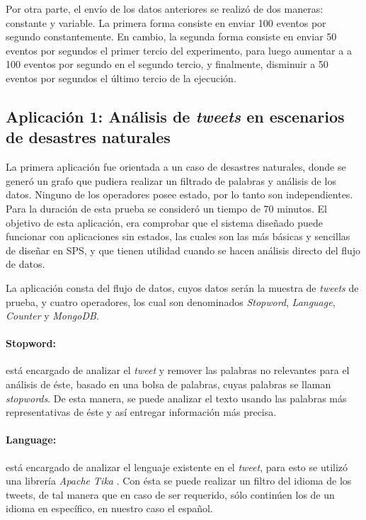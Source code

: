 Por otra parte, el envío de los datos anteriores se realizó de dos maneras: constante y variable. La primera forma consiste en enviar 100 eventos por segundo constantemente. En cambio, la segunda forma consiste en enviar 50 eventos por segundos el primer tercio del experimento, para luego aumentar a a 100 eventos por segundo en el segundo tercio, y finalmente, disminuir a 50 eventos por segundos el último tercio de la ejecución.

\subsection{Aplicación 1: Análisis de \textit{tweets} en escenarios de desastres naturales}
La primera aplicación fue orientada a un caso de desastres naturales, donde se generó un grafo que pudiera realizar un filtrado de palabras y análisis de los datos. Ninguno de los operadores posee estado, por lo tanto son independientes. Para la duración de esta prueba se consideró un tiempo de 70 minutos. El objetivo de esta aplicación, era comprobar que el sistema diseñado puede funcionar con aplicaciones sin estados, las cuales son las más básicas y sencillas de diseñar en SPS, y que tienen utilidad cuando se hacen análisis directo del flujo de datos.

La aplicación consta del flujo de datos, cuyos datos serán la muestra de \textit{tweets} de prueba, y cuatro operadores, los cual son denominados \textit{Stopword}, \textit{Language}, \textit{Counter} y \textit{MongoDB}.

\paragraph{Stopword:} está encargado de analizar el \textit{tweet} y remover las palabras no relevantes para el análisis de éste, basado en una bolsa de palabras, cuyas palabras se llaman \textit{stopwords}. De esta manera, se puede analizar el texto usando las palabras más representativas de éste y así entregar información más precisa.

\paragraph{Language:} está encargado de analizar el lenguaje existente en el \textit{tweet}, para esto se utilizó una librería \textit{Apache Tika} \citep{mattmann2011tika}. Con ésta se puede realizar un filtro del idioma de los tweets, de tal manera que en caso de ser requerido, sólo continúen los de un idioma en específico, en nuestro caso el español.


